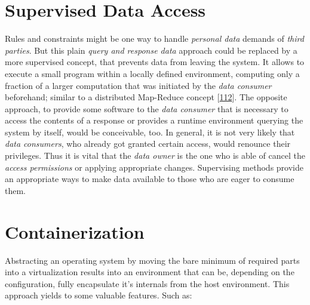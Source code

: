 \documentclass[12pt,english,a4paper,titlepage,cleardoublepage=empty,dottedtoc]{report}
\begin{document}
\section{Supervised Data Access}\label{supervised-data-access}

Rules and constraints might be one way to handle \emph{personal data}
demands of \emph{third parties}. But this plain \emph{query and response
data} approach could be replaced by a more supervised concept, that
prevents data from leaving the system. It allows to execute a small
program within a locally defined environment, computing only a fraction
of a larger computation that was initiated by the \emph{data consumer}
beforehand; similar to a distributed Map-Reduce concept
{[}\protect\hyperlink{ref-paper_2004_distributed-mapreduce}{112}{]}. The
opposite approach, to provide some software to the \emph{data consumer}
that is necessary to access the contents of a response or provides a
runtime environment querying the system by itself, would be conceivable,
too. In general, it is not very likely that \emph{data consumers}, who
already got granted certain access, would renounce their privileges.
Thus it is vital that the \emph{data owner} is the one who is able of
cancel the \emph{access permissions} or applying appropriate changes.
Supervising methods provide an appropriate ways to make data available
to those who are eager to consume them.

\section{Containerization}\label{containerization}

Abstracting an operating system by moving the bare minimum of required
parts into a virtualization results into an environment that can be,
depending on the configuration, fully encapsulate it's internals from
the host environment. This approach yields to some valuable features.
Such as:
\end{document}
